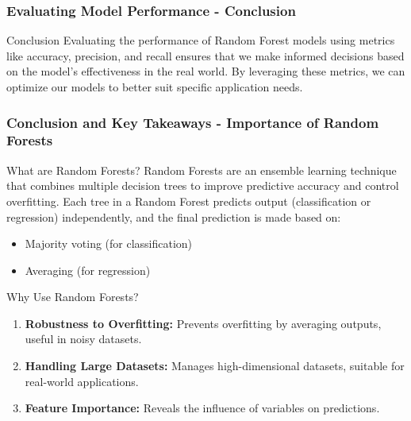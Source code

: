 \documentclass[aspectratio=169]{beamer}
\begin{document}
\begin{frame}[fragile]
    \frametitle{Evaluating Model Performance - Conclusion}
    \begin{block}{Conclusion}
        Evaluating the performance of Random Forest models using metrics like accuracy, precision, and recall ensures that we make informed decisions based on the model's effectiveness in the real world. By leveraging these metrics, we can optimize our models to better suit specific application needs.
    \end{block}
\end{frame}

\begin{frame}[fragile]
    \frametitle{Conclusion and Key Takeaways - Importance of Random Forests}
    \begin{block}{What are Random Forests?}
        Random Forests are an ensemble learning technique that combines multiple decision trees to improve predictive accuracy and control overfitting. 
        Each tree in a Random Forest predicts output (classification or regression) independently, and the final prediction is made based on:
        \begin{itemize}
            \item Majority voting (for classification)
            \item Averaging (for regression)
        \end{itemize}
    \end{block}

    \begin{block}{Why Use Random Forests?}
        \begin{enumerate}
            \item \textbf{Robustness to Overfitting:} Prevents overfitting by averaging outputs, useful in noisy datasets.
            \item \textbf{Handling Large Datasets:} Manages high-dimensional datasets, suitable for real-world applications.
            \item \textbf{Feature Importance:} Reveals the influence of variables on predictions.
        \end{enumerate}
    \end{block}
\end{frame}
\end{document}
